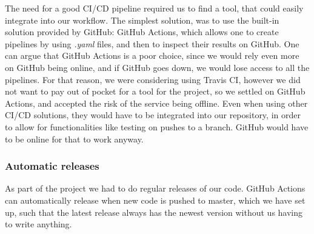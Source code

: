 The need for a good CI/CD pipeline required us to find a tool, that could easily integrate into our workflow. The simplest solution, was to use the built-in solution provided by GitHub: GitHub Actions, which allows one to create pipelines by using \textit{.yaml} files, and then to inspect their results on GitHub. One can argue that GitHub Actions is a poor choice, since we would rely even more on GitHub being online, and if GitHub goes down, we would lose access to all the pipelines. For that reason, we were considering using Travis CI, however we did not want to pay out of pocket for a tool for the project, so we settled on GitHub Actions, and accepted the risk of the service being offline.
Even when using other CI/CD solutions, they would have to be integrated into our repository, in order to allow for functionalities like testing on pushes to a branch. GitHub would have to be online for that to work anyway.

\subsubsection{Automatic releases}
As part of the project we had to do regular releases of our code. GitHub Actions can automatically release when new code is pushed to master, which we have set up, such that the latest release always has the newest version without us having to write anything.